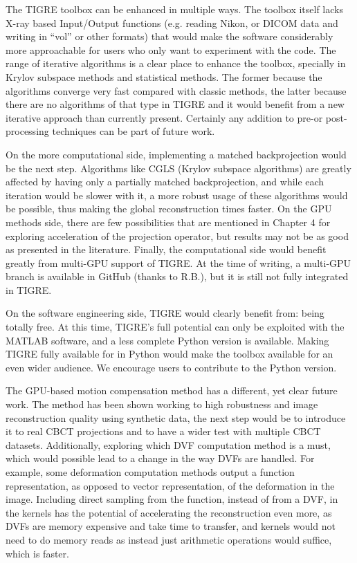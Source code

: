 The TIGRE toolbox can be enhanced in multiple ways. The toolbox itself lacks X-ray based Input/Output functions (e.g. reading Nikon, or DICOM data and writing in ``vol'' or other formats) that would make the software considerably more approachable for users who only want to experiment with the code. The range of iterative algorithms is a clear place to enhance the toolbox, specially in Krylov subspace methods and statistical methods. The former because the algorithms converge very fast compared with classic methods, the latter because there are no algorithms of that type in TIGRE and it would benefit from a new iterative approach than currently present. Certainly any addition to pre-or post-processing techniques can be part of future work.

On the more computational side, implementing a matched backprojection would be the next step. Algorithms like CGLS (Krylov subspace algorithms) are greatly affected by having only a partially matched backprojection, and while each iteration would be slower with it, a more robust usage of these algorithms would be possible, thus making the global reconstruction times faster. On the GPU methods side, there are few possibilities that are mentioned in Chapter 4 for exploring acceleration of the projection operator, but results may not be as good as presented in the literature. Finally, the computational side would benefit greatly from multi-GPU support of TIGRE. At the time of writing, a multi-GPU branch is available in GitHub (thanks to R.B.), but it is still not fully integrated in TIGRE.

On the software engineering side, TIGRE would clearly benefit from: being totally free. At this time, TIGRE's full potential can only be exploited with the MATLAB software, and a less complete Python version is available. Making TIGRE fully available for in Python would make the toolbox available for an even wider audience. We encourage users to contribute to the Python version.

The GPU-based motion compensation method has a different, yet clear future work. The method has been shown working to high robustness and image reconstruction quality using synthetic data, the next step would be to introduce it to real CBCT projections and to have a wider test with multiple CBCT datasets. Additionally, exploring which DVF computation method is a must, which would possible lead to a change in the way DVFs are handled. For example, some deformation computation methods output a function representation, as opposed to vector representation, of the deformation in the image. Including direct sampling from the function, instead of from a DVF, in the kernels has the potential of accelerating the reconstruction even more, as DVFs are memory expensive and take time to transfer, and kernels would not need to do memory reads as instead just arithmetic operations would suffice, which is faster.

